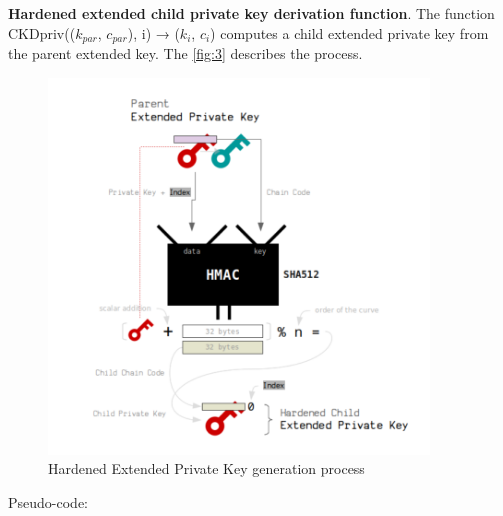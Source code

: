\bigskip
{\textbf{Hardened extended child private key derivation function}}. The function CKDpriv(($k_{par}$, $c_{par}$), i) → ($k_i$, $c_i$) computes a child extended private key from the parent extended key.
The \autoref{fig:3} describes the process.

\begin{figure}[ht!]
    \centering
    \includegraphics[width=0.9\textwidth]{images/hard_private_gen.png}
    \caption[Hardened Extended Private Key generation process]{Hardened Extended Private Key generation process \cite{learnme}}
    \label{fig:3}
\end{figure}

Pseudo-code:

